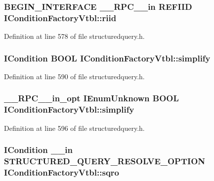 \subsubsection[{\texorpdfstring{riid}{riid}}]{\setlength{\rightskip}{0pt plus 5cm}B\+E\+G\+I\+N\+\_\+\+I\+N\+T\+E\+R\+F\+A\+CE {\bf \+\_\+\+\_\+\+R\+P\+C\+\_\+\+\_\+in} {\bf R\+E\+F\+I\+ID} I\+Condition\+Factory\+Vtbl\+::riid}\hypertarget{struct_i_condition_factory_vtbl_a9c81f731130db6da4f82bcf7aebc7119}{}\label{struct_i_condition_factory_vtbl_a9c81f731130db6da4f82bcf7aebc7119}


Definition at line 578 of file structuredquery.\+h.

\subsubsection[{\texorpdfstring{simplify}{simplify}}]{ {\bf I\+Condition} {\bf B\+O\+OL} I\+Condition\+Factory\+Vtbl\+::simplify}\hypertarget{struct_i_condition_factory_vtbl_a31111fb36b67ccbc13aac8136c3ca313}{}\label{struct_i_condition_factory_vtbl_a31111fb36b67ccbc13aac8136c3ca313}


Definition at line 590 of file structuredquery.\+h.

\subsubsection[{\texorpdfstring{simplify}{simplify}}]{ {\bf \+\_\+\+\_\+\+R\+P\+C\+\_\+\+\_\+in\+\_\+opt} I\+Enum\+Unknown {\bf B\+O\+OL} I\+Condition\+Factory\+Vtbl\+::simplify}\hypertarget{struct_i_condition_factory_vtbl_ad6ef1a6e75e9b04e09dbd40978a69252}{}\label{struct_i_condition_factory_vtbl_ad6ef1a6e75e9b04e09dbd40978a69252}


Definition at line 596 of file structuredquery.\+h.

\subsubsection[{\texorpdfstring{sqro}{sqro}}]{ {\bf I\+Condition} {\bf \+\_\+\+\_\+in} {\bf S\+T\+R\+U\+C\+T\+U\+R\+E\+D\+\_\+\+Q\+U\+E\+R\+Y\+\_\+\+R\+E\+S\+O\+L\+V\+E\+\_\+\+O\+P\+T\+I\+ON} I\+Condition\+Factory\+Vtbl\+::sqro}\hypertarget{struct_i_condition_factory_vtbl_a6911eb29487cd14f270392ed246b7b34}{}\label{struct_i_condition_factory_vtbl_a6911eb29487cd14f270392ed246b7b34}


